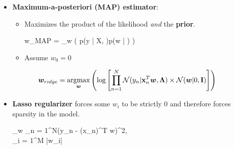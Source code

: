 \begin{itemize}
    \item \textbf{Maximum-a-posteriori (MAP) estimator}: %
	     \begin{itemize}
	     	\item Maximizes the product of the likelihood \textit{and} the \textbf{prior}.
	     	\begin{myalign*}
	     	     \bm w_{MAP} = \argmax_{\bm w} 
	     	     \left(
	     	     	p(\*y | \*X, \bm \Lambda)p(\bm w | \bm \Sigma)
	     	     \right)
	     	 \end{myalign*} 
	     	\item Assume $w_0 = 0$
	     	\end{itemize}
	     	\end{itemize}
$$
    \bm w_{ridge} = \operatorname*{argmax}_{\bm w}
    \left(
	    \log 
	    \left[
		\prod_{n = 1}^N \mathcal{N}(y_n | \mathbf{x}^T_n \bm w, \bm \Lambda) \times \mathcal{N}(\bm w | 0, \mathbf{I})
	    \right]
	\right)
$$
	\begin{itemize}
	\item \textbf{Lasso regularizer} forces some $w_i$ to be strictly 0 and therefore forces sparsity in the model.
	\begin{myalign*}
	    \min_{\bm w}  \sum_{n = 1}^N(y_n - \bm{\tilde{\phi}}(\*x_n)^T \bm w)^2, \hspace{10pt} \\ \sum_{i = 1}^M |w_i| \leq \tau
	\end{myalign*}
\end{itemize}




